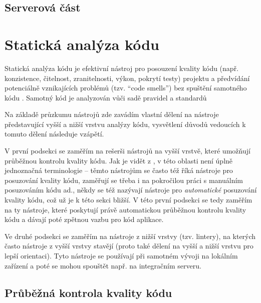\subsection{Serverová část}

\section{Statická analýza kódu}
Statická analýza kódu je efektivní nástroj pro posouzení kvality kódu (např. konzistence, čitelnost, zranitelnosti, výkon, pokrytí testy) projektu a předvídání potenciálně vznikajících problémů (tzv. \enquote{code smells}) bez spuštění samotného kódu \cite{medium-devgurus, static-overops}. Samotný kód je analyzován vůči sadě pravidel a standardů \cite{static-overops}

Na základě průzkumu nástrojů zde zavádím vlastní dělení na nástroje představující vyšší a nižší vrstvu analýzy kódu, vysvětlení důvodů vedoucích k tomuto dělení následuje vzápětí.

V první podsekci se zaměřím na rešerši nástrojů na vyšší vrstvě, které umožňují průběžnou kontrolu kvality kódu. Jak je vidět z \cite{guru-codereview, gh-awesomecodereview, medium-devgurus,stackshare-codereview, gh-awesomecodereview2}, v této oblasti není úplně jednoznačná terminologie -- těmto nástrojům se často též říká nástroje pro posuzování kvality kódu, zaměřují se třeba i na pokročilou práci s manuálním posuzováním kódu ad., někdy se též nazývají nástroje pro \textit{automatické} posuzování kvality kódu, což už je k této sekci bližší. V této první podsekci se tedy zaměřím na ty nástroje, které poskytují právě automatickou průběžnou kontrolu kvality kódu a dávají poté zpětnou vazbu pro kód aplikace.

Ve druhé podsekci se zaměřím na nástroje z nižší vrstvy (tzv. lintery), na kterých často nástroje z vyšší vrstvy stavějí (proto také dělení na vyšší a nižší vrstvu pro lepší orientaci). Tyto nástroje se používají při samotném vývoji na lokálním zařízení a poté se mohou spouštět např. na integračním serveru.

\subsection{Průběžná kontrola kvality kódu}

